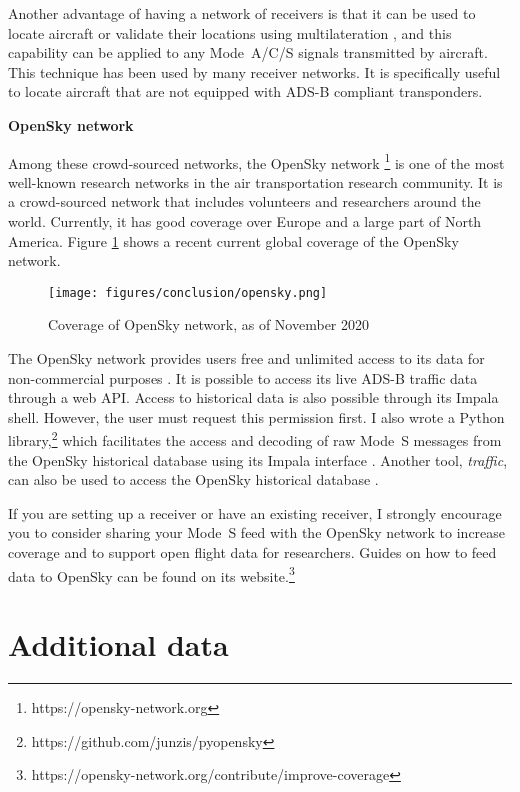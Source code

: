 Another advantage of having a network of receivers is that it can be used to locate aircraft or validate their locations using multilateration \cite{kaune2012}, and this capability can be applied to any Mode~A/C/S signals transmitted by aircraft. This technique has been used by many receiver networks. It is specifically useful to locate aircraft that are not equipped with ADS-B compliant transponders.

{\large\textbf{OpenSky network}}

Among these crowd-sourced networks, the OpenSky network \footnote{https://opensky-network.org} is one of the most well-known research networks in the air transportation research community. It is a crowd-sourced network that includes volunteers and researchers around the world. Currently, it has good coverage over Europe and a large part of North America. Figure \ref{fig:opensky_coverage} shows a recent current global coverage of the OpenSky network.

\begin{figure}[ht]
    \centering
    \texttt{[image: figures/conclusion/opensky.png]}
    \caption{Coverage of OpenSky network, as of November 2020}
    \label{fig:opensky_coverage}
\end{figure}

The OpenSky network provides users free and unlimited access to its data for non-commercial purposes \cite{schafer2014opensky}. It is possible to access its live ADS-B traffic data through a web API. Access to historical data is also possible through its Impala shell. However, the user must request this permission first. I also wrote a Python library,\footnote{https://github.com/junzis/pyopensky} which facilitates the access and decoding of raw Mode~S messages from the OpenSky historical database using its Impala interface \cite{sun2019pyopensky}. Another tool, \emph{traffic}, can also be used to access the OpenSky historical database \cite{olive2019}.

If you are setting up a receiver or have an existing receiver, I strongly encourage you to consider sharing your Mode~S feed with the OpenSky network to increase coverage and to support open flight data for researchers. Guides on how to feed data to OpenSky can be found on its website.\footnote{https://opensky-network.org/contribute/improve-coverage}

\section{Additional data}

